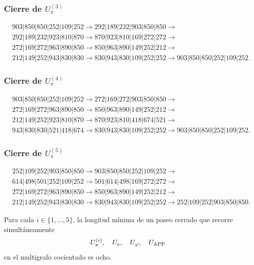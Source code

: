 \subsubsection{Cierre de \texorpdfstring{\(U_\pi^{(3)}\)}{U-pi 3}}
\begin{align*}
&903|850|850|252|109|252\to
292|189|232|903|850|850\to\\
&292|189|232|923|810|870\to
870|923|810|169|272|272\to\\
&272|169|272|963|890|850\to
850|963|890|149|252|212\to\\
&212|149|252|943|830|830\to
830|943|830|109|252|252\to
903|850|850|252|109|252.
\end{align*}

\subsubsection{Cierre de \texorpdfstring{\(U_\pi^{(4)}\)}{U-pi 4}}
\begin{align*}
&903|850|850|252|109|252\to
272|169|272|903|850|850\to\\
&272|169|272|963|890|850\to
850|963|890|149|252|212\to\\
&212|149|252|923|810|870\to
870|923|810|418|674|521\to\\
&943|830|830|521|418|674\to
830|943|830|109|252|252\to
903|850|850|252|109|252.
\end{align*}

\subsubsection{Cierre de \texorpdfstring{\(U_\pi^{(5)}\)}{U-pi 5}}
\begin{align*}
&252|109|252|903|850|850\to
903|850|850|252|109|252\to\\
&614|498|501|252|109|252\to
501|614|498|169|272|272\to\\
&272|169|272|963|890|850\to
850|963|890|149|252|212\to\\
&212|149|252|943|830|830\to
830|943|830|109|252|252\to
252|109|252|903|850|850.
\end{align*}

\begin{theorem}
\label{p12-83-c8-s1:thm:minimalidad-cierres-pi-autonoma}
Para cada \(i\in\{1,\ldots,5\}\), la longitud mínima de un paseo cerrado
que recorre simultáneamente
\[
 U_\pi^{(i)},\quad U_e,\quad U_\varphi,\quad U_{\rm APP}
\]
en el multigrafo cocientado es ocho.
\end{theorem}

